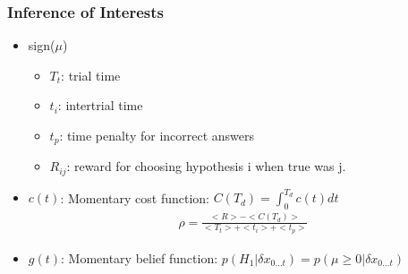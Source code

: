 \documentclass[xcolor=dvipsnames]{beamer} %
\begin{document}
\begin{frame}
	\frametitle{Inference of Interests}
	\begin{itemize}
		\item sign($\mu$)
		\begin{itemize}
			\item $T_t$: trial time
			\item $t_i$: intertrial time
			\item $t_p$: time penalty for incorrect answers
			\item $R_{ij}$: reward for choosing hypothesis i when true was j.
		\end{itemize}
		\item $c(t)$: Momentary cost function: $C(T_d) = \int_0^{T_d} c(t)dt$
	\begin{gather*}
		\rho = \frac{<R> - <C(T_d)>}{<T_t> + <t_i> + <t_p>}
	\end{gather*}
		\item $g(t)$: Momentary belief function: $p(H_1|\delta x_{0\ldots t}) = p(\mu \geq 0 | \delta x_{0\ldots t})$
	\end{itemize}
		
\end{frame}
\end{document}
